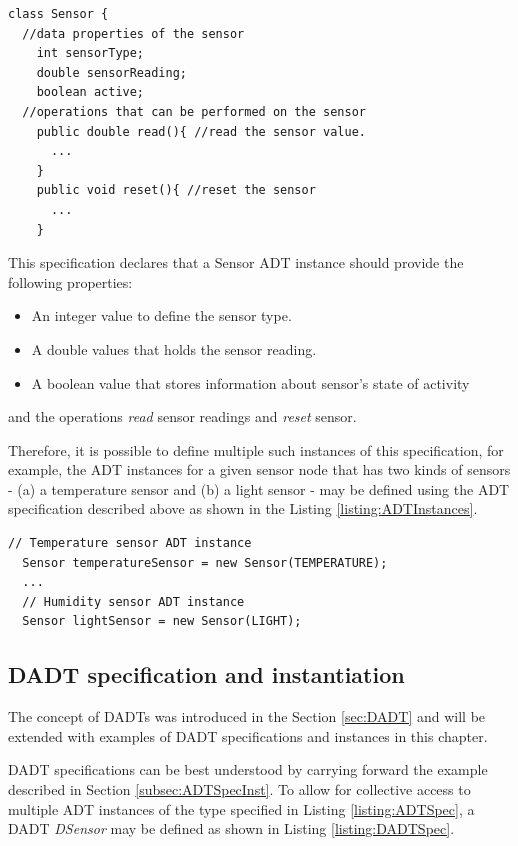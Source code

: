 \begin{lstlisting}[frame=trbl, basewidth={0.55em, 0.6em}, captionpos=b,
basicstyle=\ttfamily\footnotesize, breaklines, caption = Sensor ADT instances, label =
listing:ADTSpec]
class Sensor {
  //data properties of the sensor 
    int sensorType;
    double sensorReading;
    boolean active; 
  //operations that can be performed on the sensor  
    public double read(){ //read the sensor value.
	  ...
	} 
	public void reset(){ //reset the sensor
	  ...
	}    
\end{lstlisting}

This specification declares that a Sensor ADT instance should provide the following properties:
\begin{itemize}
\item An integer value to define the sensor type.   
\item A double values that holds the sensor reading. 
\item A boolean value that stores information about sensor's state of activity
\end{itemize}

and the operations \emph{read} sensor readings and \emph{reset} sensor.

Therefore, it is possible to define multiple such instances of this
specification, for example, the ADT instances for a given sensor node that has two kinds of sensors - (a) a
temperature sensor and (b) a light sensor - may be defined using the ADT
specification described above as shown in the Listing
\ref{listing:ADTInstances}. 
\begin{lstlisting}[frame=trbl, basewidth={0.55em, 0.6em}, captionpos=b,
basicstyle=\ttfamily\footnotesize, breaklines, caption = Sensor ADT instances, label =
listing:ADTInstances]
  // Temperature sensor ADT instance
  Sensor temperatureSensor = new Sensor(TEMPERATURE);
  ...
  // Humidity sensor ADT instance  
  Sensor lightSensor = new Sensor(LIGHT);
\end{lstlisting}

\subsection{DADT specification and instantiation} \label{subsubsec:dadtspecandinst}

The concept of DADTs was introduced in the Section \ref{sec:DADT} and will be
extended with examples of DADT specifications and instances in this chapter.
 
DADT specifications can be best understood by carrying forward the example
described in Section \ref{subsec:ADTSpecInst}. To allow for collective access
to multiple ADT instances of the type specified in Listing
\ref{listing:ADTSpec}, a DADT \emph{DSensor} may be defined as shown in Listing
\ref{listing:DADTSpec}.   
 
